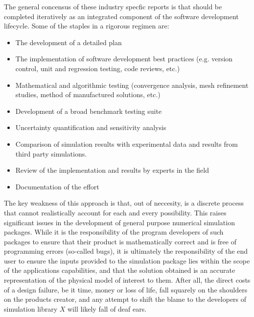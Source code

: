 The general concensus of these industry specfic \VV reports is that \VV should be completed iteratively as an integrated component of the software development lifecycle. Some of the staples in a rigorous \VV regimen are:

\begin{itemize}
 \item The development of a detailed \VV plan
 \item The implementation of software development best practices (e.g. version control, unit and regression testing, code reviews, etc.)
 \item Mathematical and algorithmic testing (convergence analysis, mesh refinement studies, method of manufactured solutions, etc.)
 \item Development of a broad benchmark testing suite
 \item Uncertainty quantification and sensitivity analysis
 \item Comparison of simulation results with experimental data and results from third party simulations. 
 \item Review of the implementation and results by experts in the field
 \item Documentation of the \VV effort
\end{itemize}

The key weakness of this approach is that, out of neccesity, \VV is a discrete process that cannot realistically account for each and every possibility. This raises significant issues in the development of general purpose numerical simulation packages. While it is the responsibility of the program developers of such packages to ensure that their product is mathematically correct and is free of programming errors (so-called bugs), it is ultimately the responsibility of the end user to ensure the inputs provided to the simulation package lies within the scope of the applications capabilities, and that the solution obtained is an accurate representation of the physical model of interest to them. After all, the direct costs of a design failure, be it time, money or loss of life, fall squarely on the shoulders on the products creator, and any attempt to shift the blame to the developers of simulation library $X$ will likely fall of deaf ears. 

